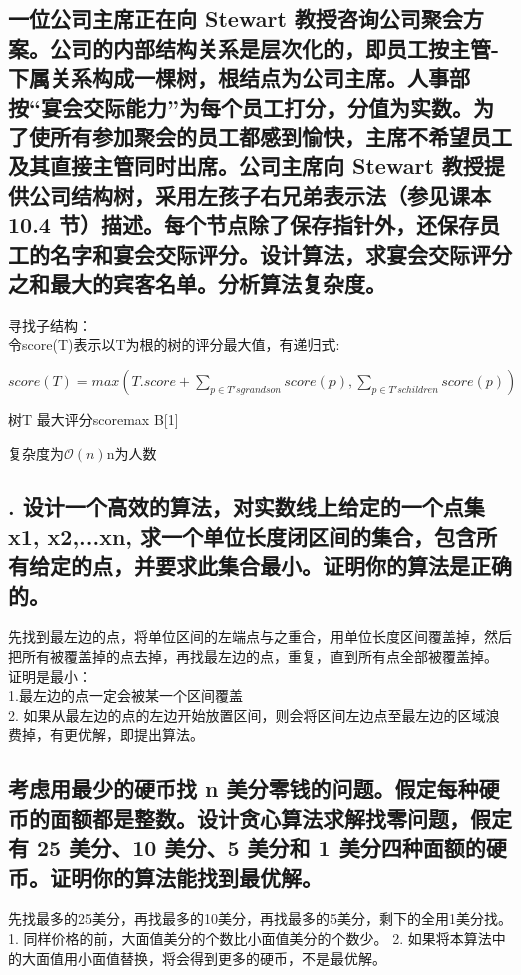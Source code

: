 \documentclass[UTF8]{ctexart}
\begin{document}
\subsection{一位公司主席正在向 Stewart 教授咨询公司聚会方案。公司的内部结构关系是层次化的，即员工按主管-下属关系构成一棵树，根结点为公司主席。人事部按“宴会交际能力”为每个员工打分，分值为实数。为了使所有参加聚会的员工都感到愉快，主席不希望员工及其直接主管同时出席。公司主席向 Stewart 教授提供公司结构树，采用左孩子右兄弟表示法（参见课本 10.4 节）描述。每个节点除了保存指针外，还保存员工的名字和宴会交际评分。设计算法，求宴会交际评分之和最大的宾客名单。分析算法复杂度。}
寻找子结构：\\
令score(T)表示以T为根的树的评分最大值，有递归式:\\
\begin{center}
$score(T) = max(T.score+\sum_{p\in T's grandson}score(p), \sum_{p\in T's children}score(p))$
\end{center}

\begin{algorithm}
	\caption{}
	\begin{algorithmic}[1]%
	\Require 树T
	\Ensure 最大评分scoremax
	\EndFor
		\Else
			\Else
			\EndIf
		\EndIf
	\EndFor
	\Return B[1]
	\end{algorithmic}
\end{algorithm}
复杂度为$\mathcal{O}(n)$n为人数
\subsection{. 设计一个高效的算法，对实数线上给定的一个点集 {x1, x2,...xn}, 求一个单位长度闭区间的集合，包含所有给定的点，并要求此集合最小。证明你的算法是正确的。}
先找到最左边的点，将单位区间的左端点与之重合，用单位长度区间覆盖掉，然后把所有被覆盖掉的点去掉，再找最左边的点，重复，直到所有点全部被覆盖掉。
证明是最小：\\
1.最左边的点一定会被某一个区间覆盖\\
2. 如果从最左边的点的左边开始放置区间，则会将区间左边点至最左边的区域浪费掉，有更优解，即提出算法。\\

\subsection{考虑用最少的硬币找 n 美分零钱的问题。假定每种硬币的面额都是整数。设计贪心算法求解找零问题，假定有 25 美分、10 美分、5 美分和 1 美分四种面额的硬币。证明你的算法能找到最优解。}
先找最多的25美分，再找最多的10美分，再找最多的5美分，剩下的全用1美分找。\\
1. 同样价格的前，大面值美分的个数比小面值美分的个数少。
2. 如果将本算法中的大面值用小面值替换，将会得到更多的硬币，不是最优解。
\end{document}
